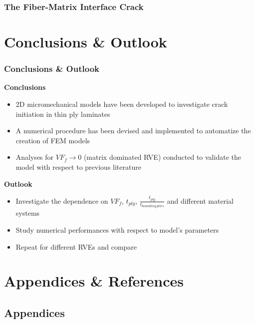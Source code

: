 \documentclass[first,firstsupp,lastsupp,handout,last,hyperref,table]{ETHclass}
\begin{document}
\begin{frame}
\frametitle{The Fiber-Matrix Interface Crack}
\vspace{-0.5cm}
\centering

\end{frame}




\section[Conclusions]{Conclusions \& Outlook}

\begin{frame}
\frametitle{\vspace*{0.5cm} Conclusions \& Outlook}
\vspace{-0.75cm}
\centering
\scriptsize
\begin{alertblock}{\footnotesize \bf{Conclusions}}
\begin{itemize}
   	\item 2D micromechanical models have been developed to investigate crack initiation in thin ply laminates
	\item A numerical procedure has been devised and implemented to automatize the creation of FEM models
	\item Analyses for $VF_{f}\to 0$ (matrix dominated RVE) conducted to validate the model with respect to previous literature
\end{itemize}
\end{alertblock}
\begin{alertblock}{\footnotesize \bf{Outlook}}
\begin{itemize}
	\item Investigate the dependence on $VF_{f}$, $t_{ply}$, $\frac{t_{ply}}{t_{bounding\ plies}}$ and different material systems\\[9pt]
	\item Study numerical performances with respect to model's parameters\\[9pt]
	\item Repeat for different RVEs and compare
\end{itemize}
\end{alertblock}
\end{frame}

\section{Appendices \& References}

\subsection{Appendices}
\end{document}
